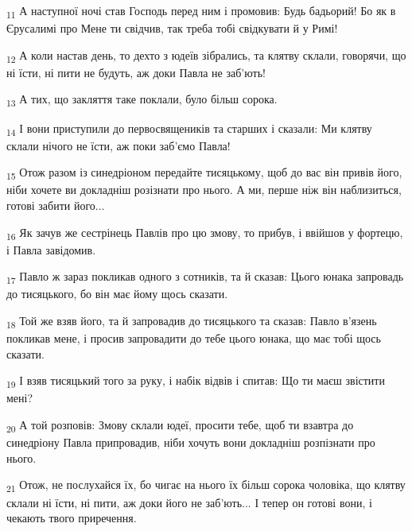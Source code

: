 \begin{tcolorbox}
\textsubscript{11} А наступної ночі став Господь перед ним і промовив: Будь бадьорий! Бо як в Єрусалимі про Мене ти свідчив, так треба тобі свідкувати й у Римі!
\end{tcolorbox}
\begin{tcolorbox}
\textsubscript{12} А коли настав день, то дехто з юдеїв зібрались, та клятву склали, говорячи, що ні їсти, ні пити не будуть, аж доки Павла не заб'ють!
\end{tcolorbox}
\begin{tcolorbox}
\textsubscript{13} А тих, що закляття таке поклали, було більш сорока.
\end{tcolorbox}
\begin{tcolorbox}
\textsubscript{14} І вони приступили до первосвящеників та старших і сказали: Ми клятву склали нічого не їсти, аж поки заб'ємо Павла!
\end{tcolorbox}
\begin{tcolorbox}
\textsubscript{15} Отож разом із синедріоном передайте тисяцькому, щоб до вас він привів його, ніби хочете ви докладніш розізнати про нього. А ми, перше ніж він наблизиться, готові забити його...
\end{tcolorbox}
\begin{tcolorbox}
\textsubscript{16} Як зачув же сестрінець Павлів про цю змову, то прибув, і ввійшов у фортецю, і Павла завідомив.
\end{tcolorbox}
\begin{tcolorbox}
\textsubscript{17} Павло ж зараз покликав одного з сотників, та й сказав: Цього юнака запровадь до тисяцького, бо він має йому щось сказати.
\end{tcolorbox}
\begin{tcolorbox}
\textsubscript{18} Той же взяв його, та й запровадив до тисяцького та сказав: Павло в'язень покликав мене, і просив запровадити до тебе цього юнака, що має тобі щось сказати.
\end{tcolorbox}
\begin{tcolorbox}
\textsubscript{19} І взяв тисяцький того за руку, і набік відвів і спитав: Що ти маєш звістити мені?
\end{tcolorbox}
\begin{tcolorbox}
\textsubscript{20} А той розповів: Змову склали юдеї, просити тебе, щоб ти взавтра до синедріону Павла припровадив, ніби хочуть вони докладніш розпізнати про нього.
\end{tcolorbox}
\begin{tcolorbox}
\textsubscript{21} Отож, не послухайся їх, бо чигає на нього їх більш сорока чоловіка, що клятву склали ні їсти, ні пити, аж доки його не заб'ють... І тепер он готові вони, і чекають твого приречення.
\end{tcolorbox}
